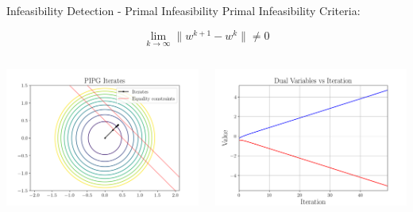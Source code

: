 \documentclass[aspectratio=169]{beamer}
\begin{document}
\begin{frame}{Infeasibility Detection - Primal Infeasibility}
    Primal Infeasibility Criteria: 
    
    \[\lim_{k\to\infty} \|w^{k+1}-w^k\| \neq 0\]
    \begin{columns}[T]
        \begin{column}{.5\textwidth}
            \includegraphics[width=7cm]{img/prim_infeas_pipg_iters.png}
        \end{column}
        \begin{column}{.5\textwidth}
            \includegraphics[width=7cm]{img/prim_infeas_dual_iters.png}
        \end{column}
    \end{columns}
\end{frame}
\end{document}
